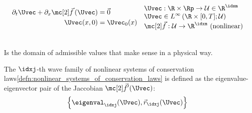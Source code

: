 \begin{defnbox}\nospacing
    \begin{defn}\label{defn:nonlinear_systems_of_conservation_laws}
        \begin{align}
          \begin{aligned}
            \partial_{t}\Uvec+\partial_{x}\fluxvec\left(\Uvec\right)&=\vec{0}\\
            \Uvec(x,0)&=\Uvec_{0}(x)\label{eq:nonlinear_systems_of_conservation_laws}
        \end{aligned}&&
        \begin{aligned}
            &\Uvec:\R\times\Rp\to\admissibleset\in\R^{\idxm} \\[-1\jot]
            &\Uvec\in L^{\infty}\left(\R\times[0,T];\admissibleset\right) \\[-1\jot]
            &\fluxvec:\admissibleset\to\R^{\idxm}\text{ (nonlinear)}
        \end{aligned}
        \end{align}
    \end{defn}
\end{defnbox}
\begin{defnbox}\nospacing
    \begin{defn}\label{defn:admissible_set}\leavevmode\\
        Is the domain of admissible values that make sense in a physical way.
    \end{defn}
\end{defnbox}
\begin{defnbox}\nospacing
    \begin{defn}\label{defn:wave_family}
        The $\idxj$-th wave family of nonlinear systems of conservation laws\cref{defn:nonlinear_systems_of_conservation_laws} is defined as the
        eigenvalue-eigenvector pair of the Jaccobian $\fluxvec'(\Uvec)$:
        \begin{align}
          \left\{\eigenval_{\idxj}(\Uvec),\vec{r}_{\idxj}(\Uvec)\right\}
        \end{align}
    \end{defn}
\end{defnbox}
